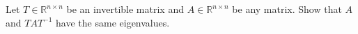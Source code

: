 Let $T \in \mathbb{R}^{n \times n}$ be an invertible matrix and $A \in \mathbb{R}^{n \times n}$ be any matrix. Show that $A$ and $T A T^{-1}$ have the same eigenvalues.\\

 